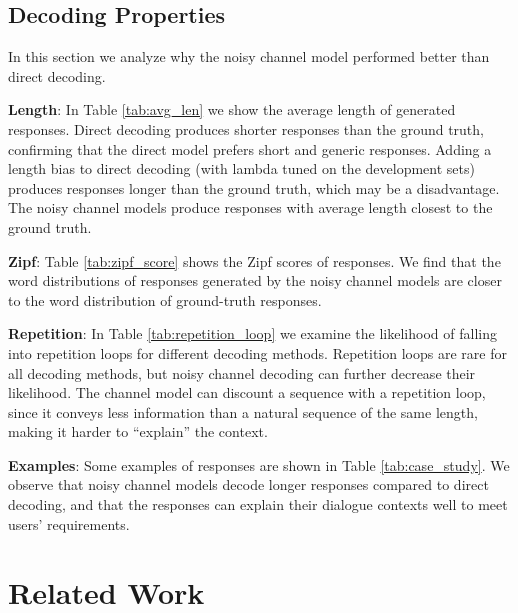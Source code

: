 \documentclass[11pt,a4paper]{article}
\begin{document}
\subsection{Decoding Properties \label{sec:decoded_response_analysis}}

In this section we analyze why the noisy channel model performed better than direct decoding.

\textbf{Length}: In Table \ref{tab:avg_len} we show the average length of generated responses. Direct decoding produces shorter responses than the ground truth, 
confirming that the direct model prefers short and generic responses.
Adding a length bias to direct decoding (with lambda tuned on the development sets) produces responses longer than the ground truth, which may be a disadvantage. The noisy channel models produce responses with average length closest to the ground truth.


\textbf{Zipf}: Table \ref{tab:zipf_score} shows the Zipf scores of responses. We find that the word distributions of responses generated by the noisy channel models are closer to the word distribution of ground-truth responses.

\textbf{Repetition}: In Table \ref{tab:repetition_loop} we examine the likelihood of falling into repetition loops \cite{holtzman2019curious} for different decoding methods. Repetition loops are rare for all decoding methods, but noisy channel decoding can further decrease their likelihood. The channel model can discount a sequence with a repetition loop, since it conveys less information than a natural sequence of the same length, making it harder to ``explain'' the context.

\textbf{Examples}: Some examples of responses are shown in Table \ref{tab:case_study}. We observe that noisy channel models decode longer responses compared to direct decoding, and that the responses can explain their dialogue contexts well to meet users' requirements.

\section{Related Work}
\end{document}
